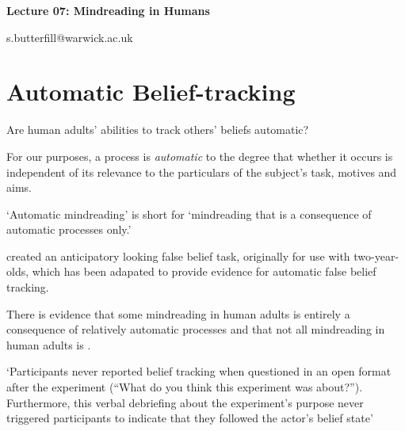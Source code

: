 \documentclass[12pt]{extarticle}
\date{}
\makeatletter
\def \ititle {Origins of Mind}
\def \iemail{s.butterfill@warwick.ac.uk}
\makeatother
\begin{document}
\begin{multicols*}{3}

\setlength\footnotesep{1em}












\def \ititle {Lecture 07: Mindreading in Humans}

\begin{center}

{\Large

\textbf{\ititle}

}



\iemail %

\end{center}



\section{Automatic Belief-tracking}

Are human adults’ abilities to track others’ beliefs automatic?

For our purposes, a process is \emph{automatic} to the degree that whether it occurs is independent of
its relevance to the particulars of the subject's task, motives and aims.

‘Automatic mindreading’ is short for ‘mindreading that is a consequence of
automatic processes only.’

\citet{Southgate:2007js} created an anticipatory looking false belief task, originally
for use with two-year-olds, which has been adapated to provide evidence for automatic
false belief tracking.

There is evidence that some mindreading in human adults is
entirely a consequence of relatively automatic processes
\citep{kovacs_social_2010,Schneider:2011fk,Wel:2013uq} and
that not all mindreading in human adults is
\citep{apperly:2008_back,apperly:2010_limits,Wel:2013uq}.

‘Participants never reported belief tracking when questioned in an open format after the experiment
(“What do you think this experiment was about?”). Furthermore, this verbal debriefing about the
experiment’s purpose never triggered participants to indicate that they followed the actor’s belief
state’ \citep[p.~2]{Schneider:2011fk}


\end{multicols*}
\end{document}
